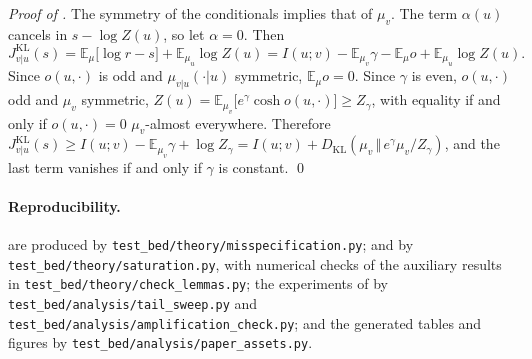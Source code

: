 \documentclass[11pt]{article}
\theoremstyle{plain}
\theoremstyle{definition}
\theoremstyle{remark}
\newcommand{\E}{\mathbb{E}}
\newcommand{\KL}[2]{D_{\mathrm{KL}}\!\left(#1\,\Vert\,#2\right)}
\newcommand{\Jvu}{J_{v\vert u}}
\begin{document}
\smallskip
\noindent\emph{Proof of .}
The symmetry of the conditionals implies that of $\mu_v$. The term
$\alpha(u)$ cancels in $s-\log Z(u)$, so let $\alpha=0$. Then
\begin{equation*}
 \Jvu^{\mathrm{KL}}(s)=\E_\mu\bigl[\log r-s\bigr]+\E_{\mu_u}\log Z(u)
 =I(u;v)-\E_{\mu_v}\gamma-\E_\mu o+\E_{\mu_u}\log Z(u).
\end{equation*}
Since $o(u,\cdot)$ is odd and $\mu_{v\vert u}(\cdot\vert u)$ symmetric,
$\E_\mu o=0$. Since $\gamma$ is even, $o(u,\cdot)$ odd and $\mu_v$ symmetric,
$Z(u)=\E_{\mu_v}\bigl[e^{\gamma}\cosh o(u,\cdot)\bigr]\ge Z_\gamma$, with
equality if and only if $o(u,\cdot)=0$ $\mu_v$-almost everywhere. Therefore
$\Jvu^{\mathrm{KL}}(s)\ge I(u;v)-\E_{\mu_v}\gamma+\log Z_\gamma=I(u;v)+\KL{\mu_v}{e^{\gamma}\mu_v/Z_\gamma}$,
and the last term vanishes if and only if $\gamma$ is constant.
\qed

\paragraph{Reproducibility.}
 are produced by
\texttt{test\_bed/theory/misspecification.py};  and
 by \texttt{test\_bed/theory/saturation.py}, with
numerical checks of the auxiliary results in
\texttt{test\_bed/theory/check\_lemmas.py}; the experiments of
by \texttt{test\_bed/analysis/tail\_sweep.py} and
\texttt{test\_bed/analysis/amplification\_check.py}; and the generated tables
and figures by \texttt{test\_bed/analysis/paper\_assets.py}.
\end{document}
